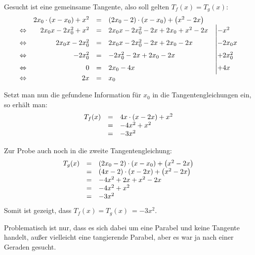 \documentclass[main.tex]{subfiles}
\begin{document}
Gesucht ist eine gemeinsame Tangente, also soll gelten $T_{f}( x) =T_{g}( x)$:
\begin{equation*}
    \begin{array}{ c r c l l }
     & 2x_{0} \cdotp ( x-x_{0}) +x^{2} & = & ( 2x_{0} -2) \cdotp ( x-x_{0}) +\left( x^{2} -2x\right) & \\
    \Leftrightarrow  & 2x_{0} x-2x_{0}^{2} +x^{2} & = & 2x_{0} x-2x_{0}^{2} -2x+2x_{0} +x^{2} -2x & \Bigl| -x^{2}\\
    \Leftrightarrow  & 2x_{0} x-2x_{0}^{2} & = & 2x_{0} x-2x_{0}^{2} -2x+2x_{0} -2x & \Bigl| -2x_{0} x\\
    \Leftrightarrow  & -2x_{0}^{2} & = & -2x_{0}^{2} -2x+2x_{0} -2x & \Bigl| +2x_{0}^{2}\\
    \Leftrightarrow  & 0 & = & 2x_{0} -4x & \Bigl| +4x\\
    \Leftrightarrow  & 2x & = & x_{0} & 
    \end{array}
\end{equation*}

Setzt man nun die gefundene Information für $x_{0}$ in die Tangentengleichungen ein, so erhält man:
\begin{equation*}
    \begin{array}{ c c l }
    T_{f}( x) & = & 4x\cdotp ( x-2x) +x^{2}\\
     & = & -4x^{2} +x^{2}\\
     & = & -3x^{2}
    \end{array}
\end{equation*}

Zur Probe auch noch in die zweite Tangentengleichung:
\begin{equation*}
    \begin{array}{ c c l }
    T_{g}( x) & = & ( 2x_{0} -2) \cdotp ( x-x_{0}) +\left( x^{2} -2x\right)\\
     & = & ( 4x-2) \cdotp ( x-2x) +\left( x^{2} -2x\right)\\
     & = & -4x^{2} +2x+x^{2} -2x\\
     & = & -4x^{2} +x^{2}\\
     & = & -3x^{2}
    \end{array}
\end{equation*}
Somit ist gezeigt, dass $T_{f}( x) =T_{g}( x) \ =-3x^{2}$.

Problematisch ist nur, dass es sich dabei um eine Parabel und keine Tangente handelt, außer vielleicht eine tangierende Parabel, aber es war ja nach einer Geraden gesucht.
\end{document}
